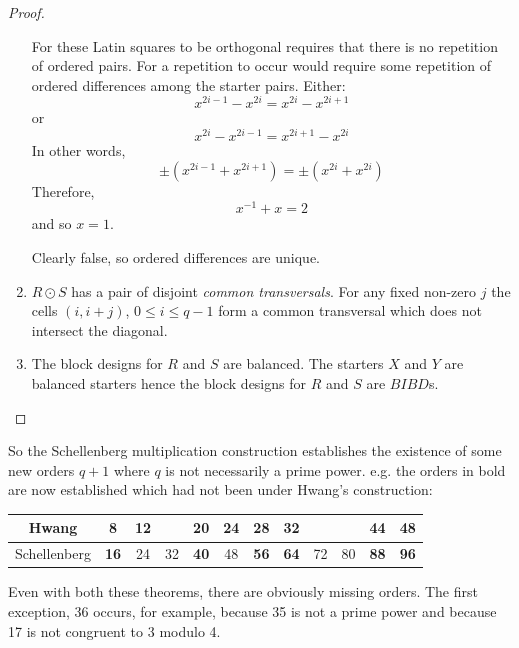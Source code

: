 \documentclass[
  11pt,
  a4paper]{book}\usepackage[]{graphicx}\usepackage[]{xcolor}
\newcounter{example}
\begin{document}
\begin{proof}
\begin{enumerate}
{      For these Latin
      squares to be orthogonal requires that there is no
      repetition of ordered pairs.  For a repetition to
      occur would require some repetition of ordered
      differences among the starter pairs.  Either:
      \begin{equation}
        x^{2i - 1} - x^{2i} = x^{2i} - x^{2i + 1}
      \end{equation}
      or
      \begin{equation}
        x^{2i} - x^{2i-1} = x^{2i+1} - x^{2i}
      \end{equation}
      In other words,
      \begin{equation}
       \pm (x^{2i - 1} + x^{2i + 1}) = \pm (x^{2i} + x^{2i})
      \end{equation}
      Therefore,
      \begin{equation}
        x^{-1} + x = 2
      \end{equation}
      and so $x = 1$.

      Clearly false, so ordered differences are unique.}
  \item{$R \odot S$ has a pair of disjoint \emph{common transversals}.
      For any fixed non-zero $j$ the cells
      $(i, i + j)$, $0 \leq i \leq q - 1$ form a common
      transversal which does not intersect the diagonal.}
  \item{The block designs for $R$ and $S$ are balanced. The
      starters $X$ and $Y$ are balanced starters hence the
      block designs for $R$ and $S$ are $BIBD$s.}
  \end{enumerate}
\end{proof}

So the Schellenberg multiplication construction establishes
the existence of some new orders $q + 1$ where $q$ is not
necessarily a prime power.  e.g.  the orders in bold are now
established which had not been under Hwang’s construction:

\begin{center}
  \begin{tabular}{|c|c|c|c|c|c|c|c|c|c|c|c|}
  \hline
     Hwang     &  8 & 12 &    & 20 & 24 & 28 & 32 &    &    & 44 & 48 \\ \hline
  Schellenberg & \textbf{16} & 24 & 32 & \textbf{40} & 48 & \textbf{56} & \textbf{64} & 72 & 80 & \textbf{88} & \textbf{96} \\ \hline
  \end{tabular}
\end{center}

Even with both these theorems, there are obviously missing
orders. The first exception, 36 occurs, for example, because
35 is not a prime power and because 17 is not congruent to
3 modulo 4.
\end{document}
